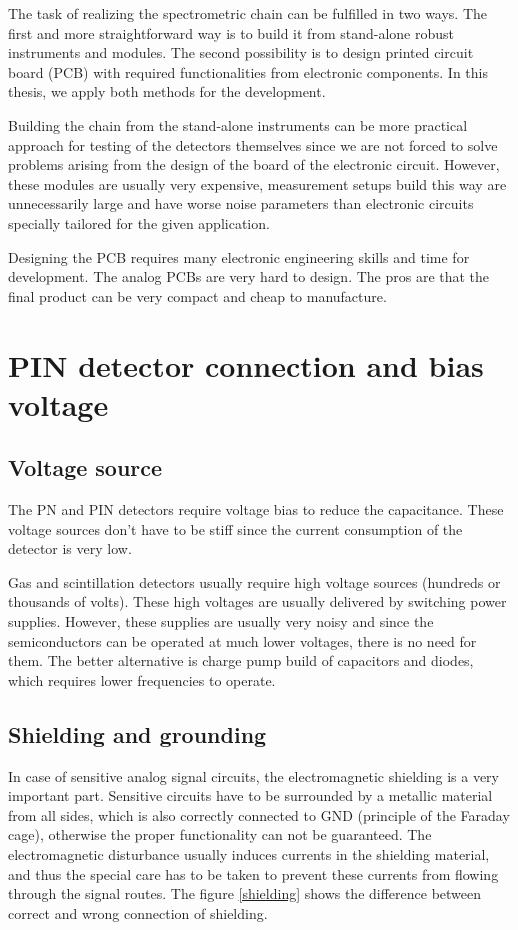 \par
The task of realizing the spectrometric chain can be fulfilled in two ways. The first and more straightforward way is to build it from stand-alone robust instruments and modules. The second possibility is to design printed circuit board (PCB) with required functionalities from electronic components. In this thesis, we apply both methods for the development. 
\par
Building the chain from the stand-alone instruments can be more practical approach for testing of the detectors themselves since we are not forced to solve problems arising from the design of the board of the electronic circuit. However, these modules are usually very expensive, measurement setups build this way are unnecessarily large and have worse noise parameters than electronic circuits specially tailored for the given application.
\par
Designing the PCB requires many electronic engineering skills and time for development. The analog PCBs are very hard to design. The pros are that the final product can be very compact and cheap to manufacture.



\section{PIN detector connection and bias voltage}
\subsection{Voltage source}
The PN and PIN detectors require voltage bias to reduce the capacitance.
These voltage sources don't have to be stiff since the current consumption of the detector is very low.
\par
Gas and scintillation detectors usually require high voltage sources (hundreds or thousands of volts). These high voltages are usually delivered by switching power supplies.
However, these supplies are usually very noisy and since the semiconductors can be operated at much lower voltages, there is no need for them. The better alternative is charge pump build of capacitors and diodes, which requires lower frequencies to operate.
\subsection{Shielding and grounding}

In case of sensitive analog signal circuits, the electromagnetic shielding is a very important part. Sensitive circuits have to be surrounded by a metallic material from all sides, which is also correctly connected to GND (principle of the Faraday cage), otherwise the proper functionality can not be guaranteed. The electromagnetic disturbance usually induces currents in the shielding material, and thus the special care has to be taken to prevent these currents from flowing through the signal routes. The figure \ref{shielding} shows the difference between correct and wrong connection of shielding.

